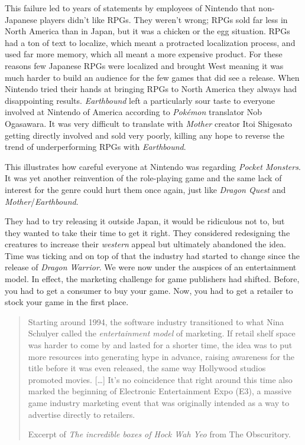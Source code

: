 \documentclass{book}
\begin{document}
This failure led to years of statements by employees of Nintendo that non-Japanese players didn’t like RPGs. They weren’t wrong; RPGs sold far less in North America than in Japan, but it was a chicken or the egg situation. RPGs had a ton of text to localize, which meant a protracted localization process, and used far more memory, which all meant a more expensive product. For these reasons few Japanese RPGs were localized and brought West meaning it was much harder to build an audience for the few games that did see a release. When Nintendo tried their hands at bringing RPGs to North America they always had disappointing results. \emph{Earthbound} left a particularly sour taste to everyone involved at Nintendo of America according to \emph{Pokémon} translator Nob Ogasawara. It was very difficult to translate with \emph{Mother} creator Itoi Shigesato getting directly involved and sold very poorly, killing any hope to reverse the trend of underperforming RPGs with \emph{Earthbound}.\par
This illustrates how careful everyone at Nintendo was regarding \emph{Pocket Monsters}. It was yet another reinvention of the role-playing game and the same lack of interest for the genre could hurt them once again, just like \emph{Dragon Quest} and \emph{Mother}/\emph{Earthbound}.\par
They had to try releasing it outside Japan, it would be ridiculous not to, but they wanted to take their time to get it right. They considered redesigning the creatures to increase their \emph{western} appeal but ultimately abandoned the idea. Time was ticking and on top of that the industry had started to change since the release of \emph{Dragon Warrior}. We were now under the auspices of an entertainment model. In effect, the marketing challenge for game publishers had shifted. Before, you had to get a consumer to buy your game. Now, you had to get a retailer to stock your game in the first place.\par
\begin{quote}
Starting around 1994, the software industry transitioned to what Nina Schulyer called the \emph{entertainment model} of marketing. If retail shelf space was harder to come by and lasted for a shorter time, the idea was to put more resources into generating hype in advance, raising awareness for the title before it was even released, the same way Hollywood studios promoted movies. […] It’s no coincidence that right around this time also marked the beginning of Electronic Entertainment Expo (E3), a massive game industry marketing event that was originally intended as a way to advertise directly to retailers.\par
Excerpt of \emph{The incredible boxes of Hock Wah Yeo} from The Obscuritory.\par
\end{quote} \par
\end{document}
